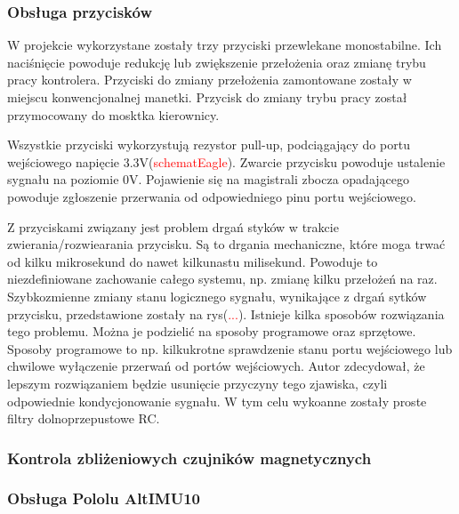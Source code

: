 \subsubsection{Obsługa przycisków}
W projekcie wykorzystane zostały trzy przyciski przewlekane monostabilne. Ich naciśnięcie powoduje redukcję lub zwiększenie przełożenia oraz zmianę trybu pracy kontrolera. Przyciski do zmiany przełożenia zamontowane zostały w miejscu konwencjonalnej manetki. Przycisk do zmiany trybu pracy został przymocowany do mosktka kierownicy.

Wszystkie przyciski wykorzystują rezystor pull-up, podciągający do portu wejściowego napięcie 3.3V(\textcolor{red}{schematEagle}). Zwarcie przycisku powoduje ustalenie sygnału na poziomie 0V. Pojawienie się na magistrali zbocza opadającego powoduje zgłoszenie przerwania od odpowiedniego pinu portu wejściowego. 

Z przyciskami związany jest problem drgań styków w trakcie zwierania/rozwiearania przycisku. Są to drgania mechaniczne, które moga trwać od kilku mikrosekund do nawet kilkunastu milisekund. Powoduje to niezdefiniowane zachowanie całego systemu, np. zmianę kilku przełożeń na raz. Szybkozmienne zmiany stanu logicznego sygnału, wynikające z drgań sytków przycisku, przedstawione zostały na rys(\textcolor{red}{...}). Istnieje kilka sposobów rozwiązania tego problemu. Można je podzielić na sposoby programowe oraz sprzętowe. Sposoby programowe to np. kilkukrotne sprawdzenie stanu portu wejściowego lub chwilowe wyłączenie przerwań od portów wejściowych. Autor zdecydował, że lepszym rozwiązaniem będzie usunięcie przyczyny tego zjawiska, czyli odpowiednie kondycjonowanie sygnału. W tym celu wykoanne zostały proste filtry dolnoprzepustowe RC.   
\subsubsection{Kontrola zbliżeniowych czujników magnetycznych}
\subsubsection{Obsługa Pololu AltIMU10}




